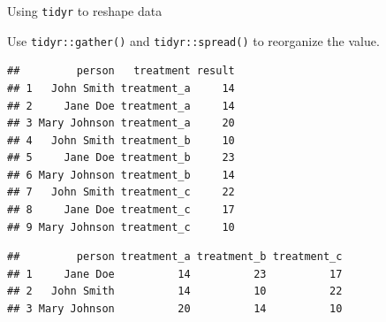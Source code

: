 \documentclass[14pt,ignorenonframetext,]{bredelebeamer}
\newenvironment{Shaded}{\begin{snugshade}}{\end{snugshade}}
\newcommand{\KeywordTok}[1]{\textcolor[rgb]{0.94,0.87,0.69}{#1}}
\newcommand{\DataTypeTok}[1]{\textcolor[rgb]{0.87,0.87,0.75}{#1}}
\newcommand{\DecValTok}[1]{\textcolor[rgb]{0.86,0.86,0.80}{#1}}
\newcommand{\StringTok}[1]{\textcolor[rgb]{0.80,0.58,0.58}{#1}}
\newcommand{\OperatorTok}[1]{\textcolor[rgb]{0.94,0.94,0.82}{#1}}
\newcommand{\NormalTok}[1]{\textcolor[rgb]{0.80,0.80,0.80}{#1}}
\begin{document}
\begin{frame}[fragile]{Using \texttt{tidyr} to reshape data}

Use \texttt{tidyr::gather()} and \texttt{tidyr::spread()} to reorganize
the value.

\begin{Shaded}
\end{Shaded}

\begin{verbatim}
##         person   treatment result
## 1   John Smith treatment_a     14
## 2     Jane Doe treatment_a     14
## 3 Mary Johnson treatment_a     20
## 4   John Smith treatment_b     10
## 5     Jane Doe treatment_b     23
## 6 Mary Johnson treatment_b     14
## 7   John Smith treatment_c     22
## 8     Jane Doe treatment_c     17
## 9 Mary Johnson treatment_c     10
\end{verbatim}

\begin{Shaded}
\end{Shaded}

\begin{verbatim}
##         person treatment_a treatment_b treatment_c
## 1     Jane Doe          14          23          17
## 2   John Smith          14          10          22
## 3 Mary Johnson          20          14          10
\end{verbatim}

\end{frame}
\end{document}
